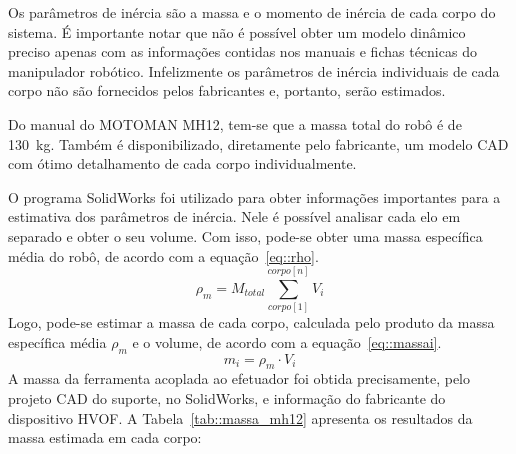 Os parâmetros de inércia são a massa e o momento de inércia de cada corpo do
sistema. É importante notar que não é possível obter um modelo dinâmico preciso
apenas com as informações contidas nos manuais e fichas técnicas do manipulador
robótico. Infelizmente os parâmetros de inércia individuais de cada corpo não
são fornecidos pelos fabricantes e, portanto, serão estimados. 

Do manual do MOTOMAN MH12, tem-se que a massa
total do robô é de 130~kg. Também é disponibilizado, diretamente pelo
fabricante, um modelo CAD com ótimo detalhamento de cada corpo individualmente.

O programa SolidWorks foi utilizado para obter informações importantes para a
estimativa dos parâmetros de inércia. Nele é possível analisar cada elo em
separado e obter o seu volume. Com isso, pode-se obter uma massa específica
média do robô, de acordo com a equação~\ref{eq::rho}.
%
\begin{equation}
	\rho_{m} = M_{total}\sum_{corpo[1]}^{corpo[n]} V_{i} \label{eq::rho}
\end{equation}
%
Logo, pode-se estimar a massa de cada corpo, calculada pelo produto da massa
específica média $\rho_{m}$ e o volume, de acordo com a
equação~\ref{eq::massai}.
%
\begin{equation}
	m_{i} = \rho_{m} \cdot V_{i} \label{eq::massai}
\end{equation}
%
A massa da ferramenta acoplada ao efetuador foi obtida precisamente, pelo
projeto CAD do suporte, no SolidWorks, e informação do fabricante do dispositivo
HVOF.
A Tabela~\ref{tab::massa_mh12} apresenta os resultados da massa estimada em cada
corpo:
%
